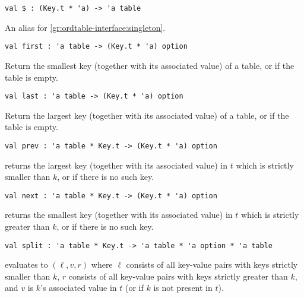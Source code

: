 \begin{gram}[\$]
\begin{verbatim}
val $ : (Key.t * 'a) -> 'a table
\end{verbatim}
An alias for \ref{gr:ordtable-interface:singleton}.
\end{gram}

\begin{gram}[first]
\begin{verbatim}
val first : 'a table -> (Key.t * 'a) option
\end{verbatim}
Return the smallest key (together with its associated value) of a table, or
 if the table is empty.
\end{gram}

\begin{gram}[last]
\begin{verbatim}
val last : 'a table -> (Key.t * 'a) option
\end{verbatim}
Return the largest key (together with its associated value) of a table, or
 if the table is empty.
\end{gram}

\begin{gram}[prev]
\begin{verbatim}
val prev : 'a table * Key.t -> (Key.t * 'a) option
\end{verbatim}
 returns the largest key (together with its associated value)
in $t$
which is strictly smaller than $k$, or  if there is no such key.
\end{gram}

\begin{gram}[next]
\begin{verbatim}
val next : 'a table * Key.t -> (Key.t * 'a) option
\end{verbatim}
 returns the smallest key (together with its associated value)
in $t$
which is strictly greater than $k$, or  if there is no such key.
\end{gram}

\begin{gram}[split]
\begin{verbatim}
val split : 'a table * Key.t -> 'a table * 'a option * 'a table
\end{verbatim}
 evaluates to $(\ell, v, r)$ where $\ell$ consists of all
key-value pairs with keys strictly smaller than $k$, $r$ consists of all key-value
pairs with keys strictly greater than $k$, and $v$ is $k$'s associated value
in $t$ (or  if $k$ is not present in $t$).
\end{gram}

